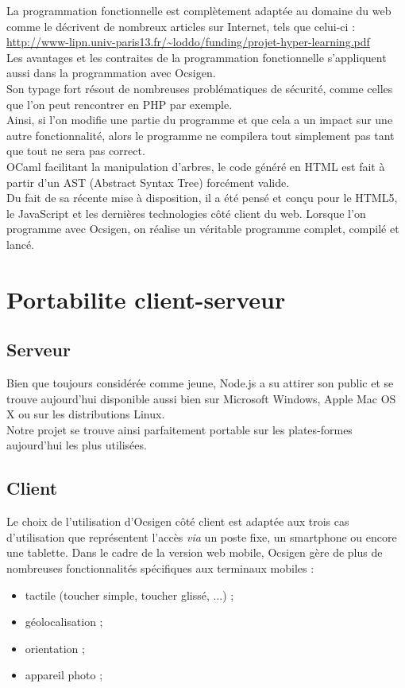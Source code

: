 \documentclass{life-fr}
\begin{document}
La programmation fonctionnelle est complètement adaptée au domaine du web comme le décrivent de nombreux articles sur Internet, tels que celui-ci :\\
\url{http://www-lipn.univ-paris13.fr/~loddo/funding/projet-hyper-learning.pdf}\\
Les avantages et les contraites de la programmation fonctionnelle s'appliquent aussi dans la programmation avec Ocsigen.\\
Son typage fort résout de nombreuses problématiques de sécurité, comme celles que l'on peut rencontrer en PHP par exemple.\\
Ainsi, si l'on modifie une partie du programme et que cela a un impact sur une autre fonctionnalité, alors le programme ne compilera tout simplement pas tant que tout ne sera pas correct.\\
OCaml facilitant la manipulation d'arbres, le code généré en HTML est fait à partir d'un AST (Abstract Syntax Tree) forcément valide.\\

Du fait de sa récente mise à disposition, il a été pensé et conçu pour le HTML5, le JavaScript et les dernières technologies côté client du web. Lorsque l'on programme avec Ocsigen, on réalise un véritable programme complet, compilé et lancé.\\
\section{Portabilite client-serveur}

\subsection{Serveur}

Bien que toujours considérée comme jeune, Node.js a su attirer son public et se trouve aujourd'hui disponible aussi bien sur Microsoft Windows, Apple Mac OS X ou sur les distributions Linux.\\
Notre projet se trouve ainsi parfaitement portable sur les plates-formes aujourd'hui les plus utilisées.\\

\subsection{Client}

Le choix de l'utilisation d'Ocsigen côté client est adaptée aux trois cas d'utilisation que représentent l'accès
\textit{via} un poste fixe, un smartphone ou encore une tablette. Dans le cadre
de la version web mobile, Ocsigen gère de plus de nombreuses fonctionnalités 
spécifiques aux terminaux mobiles :
\begin{itemize}
  \item tactile (toucher simple, toucher glissé, ...) ;
  \item géolocalisation ;
  \item orientation ;
  \item appareil photo ;
\end{itemize}
\end{document}
